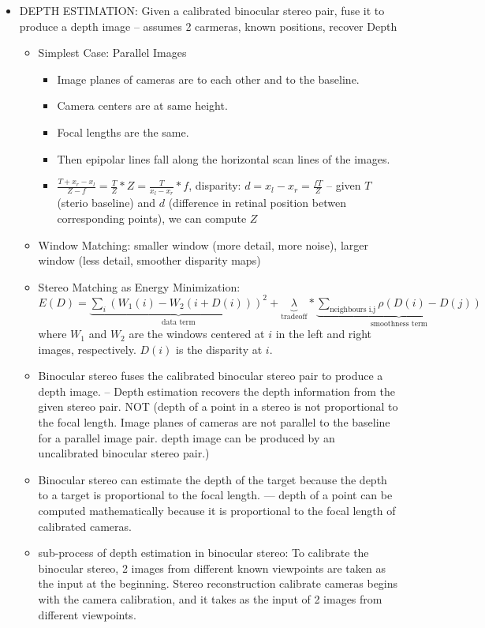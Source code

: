 \documentclass[10pt]{article}
\begin{document}
\begin{itemize}[label=\(\star\), leftmargin=1em, itemsep=-0.3em]
    \item DEPTH ESTIMATION: Given a calibrated binocular stereo pair, fuse it to produce a depth image -- assumes 2 carmeras, known positions, recover Depth
          \begin{itemize}[label=\(\star\), leftmargin=1em, itemsep=-0.3em]
              \item Simplest Case: Parallel Images
                    \begin{itemize}[label=\(\star\), leftmargin=1em]
                        \item Image planes of cameras are to each other and to the baseline.
                        \item  Camera centers are at same height.
                        \item Focal lengths are the same.
                        \item  Then epipolar lines fall along the horizontal scan lines of the images.
                        \item[] $\frac{T + x_r - x_l}{Z-f}= \frac{T}{Z} * Z = \frac{T}{x_l-x_r} * f$, disparity: $d = x_l - x_r = \frac{fT}{Z}$ -- given $T$ (sterio baseline) and $d$ (difference in retinal position betwen corresponding points), we can compute $Z$
                    \end{itemize}
              \item Window Matching: smaller window (more detail, more noise), larger window (less detail, smoother disparity maps)
              \item Stereo Matching as Energy Minimization: $E(D) = \underbrace{ \sum_i (W_1(i) - W_2(i+D(i)))^2}_{\text{data term}} + \underbrace{\lambda}_{\text{tradeoff}} *\underbrace{ \sum_{\text{neighbours i,j}} \rho (D(i) - D(j))}_{\text{smoothness term}}$ where $W_1$ and $W_2$ are the windows centered at $i$ in the left and right images, respectively. $D(i)$ is the disparity at $i$.
              \item Binocular stereo fuses the calibrated binocular stereo pair to produce a depth image. -- Depth estimation recovers the depth information from the given stereo pair. NOT (depth of a point in a stereo is not proportional to the focal length. Image planes of cameras are not parallel to the baseline for a parallel image pair. depth image can be produced by an uncalibrated binocular stereo pair.)
              \item Binocular stereo can estimate the depth of the target because the depth to a target is proportional to the focal length. --- depth of a point can be computed mathematically because it is proportional to the focal length of calibrated cameras.
              \item sub-process of depth estimation in binocular stereo: To calibrate the binocular stereo, 2 images from different known viewpoints are taken as the input at the beginning. Stereo reconstruction calibrate cameras begins with the camera calibration, and it takes as the input of 2 images from different viewpoints.
          \end{itemize}


\end{itemize}
\end{document}
